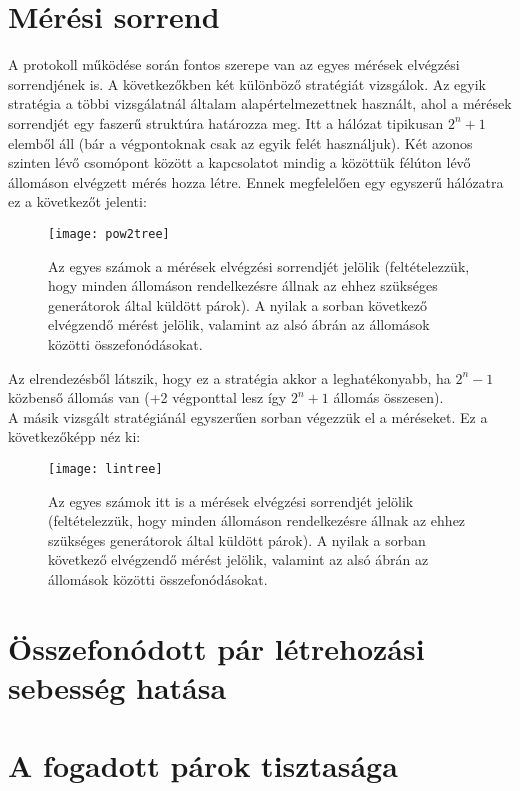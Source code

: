 \section{Mérési sorrend}

A protokoll működése során fontos szerepe van az egyes mérések elvégzési sorrendjének is. A következőkben két különböző stratégiát vizsgálok. Az egyik stratégia a többi vizsgálatnál általam alapértelmezettnek használt, ahol a mérések sorrendjét egy faszerű struktúra határozza meg. Itt a hálózat tipikusan $2^n+1$ elemből áll (bár a végpontoknak csak az egyik felét használjuk). Két azonos szinten lévő csomópont között a kapcsolatot mindig a közöttük félúton lévő állomáson elvégzett mérés hozza létre. Ennek megfelelően egy egyszerű hálózatra ez a következőt jelenti:
\begin{figure}[H]
\centering
\texttt{[image: pow2tree]}
\caption[Fa alapján történő mérési stratégia]{Az egyes számok a mérések elvégzési sorrendjét jelölik (feltételezzük, hogy minden állomáson rendelkezésre állnak az ehhez szükséges generátorok által küldött párok). A nyilak a sorban következő elvégzendő mérést jelölik, valamint az alsó ábrán az állomások közötti összefonódásokat.}
\end{figure}
Az elrendezésből látszik, hogy ez a stratégia akkor a leghatékonyabb, ha $2^n-1$ közbenső állomás van (+2 végponttal lesz így $2^n+1$ állomás összesen).\\
A másik vizsgált stratégiánál egyszerűen sorban végezzük el a méréseket. Ez a következőképp néz ki:
\begin{figure}[H]
\centering
\texttt{[image: lintree]}
\caption[Egyszerű mérési stratégia]{Az egyes számok itt is a mérések elvégzési sorrendjét jelölik (feltételezzük, hogy minden állomáson rendelkezésre állnak az ehhez szükséges generátorok által küldött párok). A nyilak a sorban következő elvégzendő mérést jelölik, valamint az alsó ábrán az állomások közötti összefonódásokat.}
\end{figure}
\section{Összefonódott pár létrehozási sebesség hatása}

\section{A fogadott párok tisztasága}

